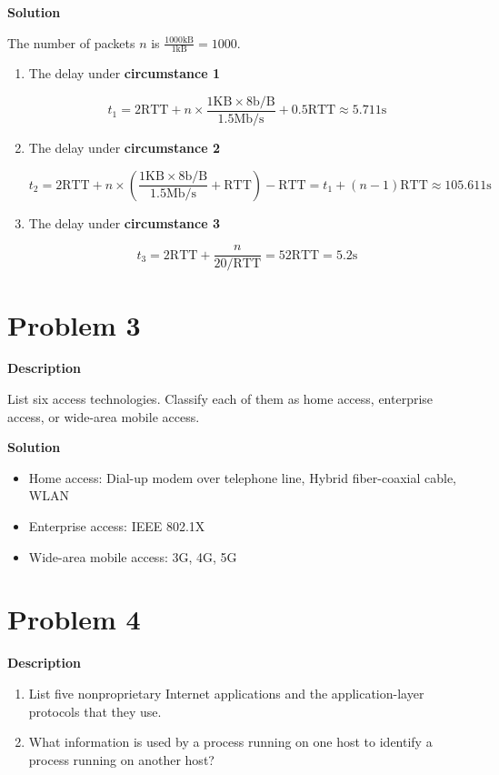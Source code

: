 \documentclass[12pt,letterpaper]{ctexart}
\begin{document}
{\bf Solution}

The number of packets $n$ is $\frac{1000\text{kB}}{1\text{kB}}=1000$.

\begin{enumerate}
  \item The delay under {\bf circumstance 1}

  $$
  t_1 = 2\text{RTT} + n \times \frac{1\text{KB} \times 8\text{b/B}}{1.5\text{Mb/s}} + 0.5\text{RTT} \approx 5.711\text{s}
  $$

  \item The delay under {\bf circumstance 2}

  $$
  t_2 = 2\text{RTT} + n \times (\frac{1\text{KB}\times 8\text{b/B}}{1.5\text{Mb/s}} + \text{RTT}) - \text{RTT} = t_1 + (n - 1) \text{RTT} \approx 105.611\text{s}
  $$

  \item The delay under {\bf circumstance 3}

  $$
  t_3 = 2\text{RTT} + \frac{n}{20/\text{RTT}} = 52\text{RTT} = 5.2\text{s}
  $$
\end{enumerate}

\section*{Problem 3}

{\bf Description}

List six access technologies. Classify each of them as home access, enterprise access, or wide-area mobile access.

{\bf Solution}

\begin{itemize}
  \item Home access: Dial-up modem over telephone line, Hybrid fiber-coaxial cable, WLAN
  \item Enterprise access: IEEE 802.1X
  \item Wide-area mobile access: 3G, 4G, 5G
\end{itemize}

\section*{Problem 4}
{\bf Description}

\begin{enumerate}
  \item List five nonproprietary Internet applications and the application-layer protocols that they use.
  \item What information is used by a process running on one host to identify a process running on another host?
\end{enumerate}
\end{document}
